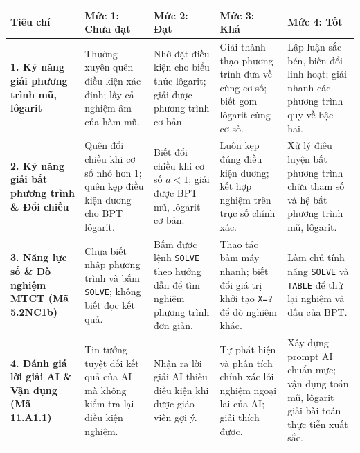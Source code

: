 \documentclass[12pt, a4paper]{article}
\begin{document}
\begin{center}
\begin{tabularx}{\textwidth}{|p{2.8cm}|X|X|X|X|}
    \hline
    \textbf{Tiêu chí} & \textbf{Mức 1: Chưa đạt} & \textbf{Mức 2: Đạt} & \textbf{Mức 3: Khá} & \textbf{Mức 4: Tốt} \\ \hline
    \textbf{1. Kỹ năng giải phương trình mũ, lôgarit} & Thường xuyên quên điều kiện xác định; lấy cả nghiệm âm của hàm mũ. & Nhớ đặt điều kiện cho biểu thức lôgarit; giải được phương trình cơ bản. & Giải thành thạo phương trình đưa về cùng cơ số; biết gom lôgarit cùng cơ số. & Lập luận sắc bén, biến đổi linh hoạt; giải nhanh các phương trình quy về bậc hai. \\ \hline
    \textbf{2. Kỹ năng giải bất phương trình \& Đổi chiều} & Quên đổi chiều khi cơ số nhỏ hơn 1; quên kẹp điều kiện dương cho BPT lôgarit. & Biết đổi chiều khi cơ số $a < 1$; giải được BPT mũ, lôgarit cơ bản. & Luôn kẹp đúng điều kiện dương; kết hợp nghiệm trên trục số chính xác. & Xử lý điêu luyện bất phương trình chứa tham số và hệ bất phương trình mũ, lôgarit. \\ \hline
    \textbf{3. Năng lực số \& Dò nghiệm MTCT (Mã 5.2NC1b)} & Chưa biết nhập phương trình và bấm \texttt{SOLVE}; không biết đọc kết quả. & Bấm được lệnh \texttt{SOLVE} theo hướng dẫn để tìm nghiệm phương trình đơn giản. & Thao tác bấm máy nhanh; biết đổi giá trị khởi tạo \texttt{X=?} để dò nghiệm khác. & Làm chủ tính năng \texttt{SOLVE} và \texttt{TABLE} để thử lại nghiệm và dấu của BPT. \\ \hline
    \textbf{4. Đánh giá lời giải AI \& Vận dụng (Mã 11.A1.1)} & Tin tưởng tuyệt đối kết quả của AI mà không kiểm tra lại điều kiện nghiệm. & Nhận ra lời giải AI thiếu điều kiện khi được giáo viên gợi ý. & Tự phát hiện và phân tích chính xác lỗi nghiệm ngoại lai của AI; giải thích được. & Xây dựng prompt AI chuẩn mực; vận dụng toán mũ, lôgarit giải bài toán thực tiễn xuất sắc. \\ \hline
\end{tabularx}
\end{center}
\end{document}
